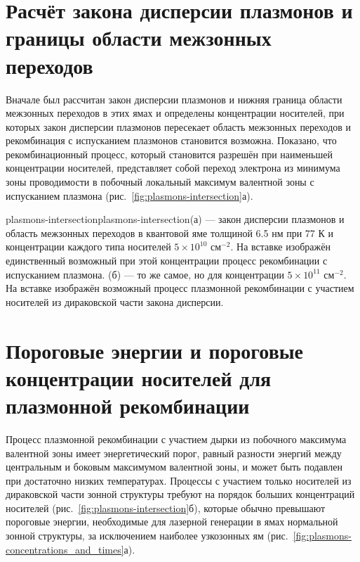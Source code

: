 \section{Расчёт закона дисперсии плазмонов и границы области межзонных переходов} \label{sec:plasmon-dispersion}
Вначале был рассчитан закон дисперсии плазмонов и нижняя граница области межзонных переходов в этих ямах и определены концентрации носителей, при которых закон дисперсии плазмонов пересекает область межзонных переходов и рекомбинация с испусканием плазмонов становится возможна. Показано, что рекомбинационный процесс, который становится разрешён при наименьшей концентрации носителей, представляет собой переход электрона из минимума зоны проводимости в побочный локальный максимум валентной зоны с испусканием плазмона (рис.~\ref{fig:plasmons-intersection}а).
\begin{fig}{plasmons-intersection}{plasmons-intersection}(а) --- закон дисперсии плазмонов и область межзонных переходов в квантовой яме \HgCdTe{} толщиной 6.5 нм при 77 К и концентрации каждого типа носителей $5\times10^{10}$ см$^{-2}$. На вставке изображён единственный возможный при этой концентрации процесс рекомбинации с испусканием плазмона. (б) --- то же самое, но для концентрации $5\times10^{11}$ см$^{-2}$. На вставке изображён возможный процесс плазмонной рекомбинации с участием носителей из дираковской части закона дисперсии.
\end{fig}
\section{Пороговые энергии и пороговые концентрации носителей для плазмонной рекомбинации} \label{sec:plasmon-thresholds}
Процесс плазмонной рекомбинации с участием дырки из побочного максимума валентной зоны имеет энергетический порог, равный разности энергий между центральным и боковым максимумом валентной зоны, и может быть подавлен при достаточно низких температурах. Процессы с участием только носителей из дираковской части зонной структуры требуют на порядок больших концентраций носителей (рис.~\ref{fig:plasmons-intersection}б), которые обычно превышают пороговые энергии, необходимые для лазерной генерации в ямах нормальной зонной структуры, за исключением наиболее узкозонных ям (рис.~\ref{fig:plasmons-concentrations_and_times}а).

